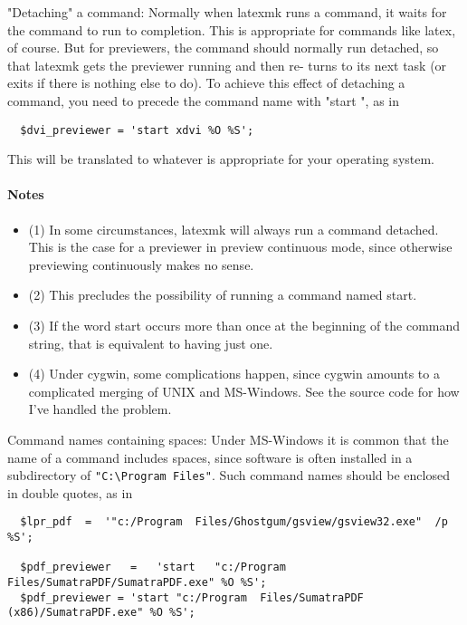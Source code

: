 "Detaching" a command: Normally when latexmk runs a command,  it  waits
for the command to run to completion.  This is appropriate for commands
like latex, of course.  But for previewers, the command should normally
run  detached,  so that latexmk gets the previewer running and then re-
turns to its next task (or exits if there is nothing else to  do).   To
achieve  this  effect  of  detaching a command, you need to precede the
command name with "start ", as in

\begin{verbatim}
  $dvi_previewer = 'start xdvi %O %S';
\end{verbatim}

This will be translated to whatever is appropriate for  your  operating
system.

\paragraph{Notes}

\begin{itemize}
  \item (1) In some circumstances, latexmk will always run a command detached.  This
is the case for a previewer in preview  continuous  mode, since  otherwise
previewing continuously makes no sense.  

  \item (2) This precludes the possibility of running a command named start.   

  \item (3)  If  the word  start  occurs  more  than  once  at  the beginning
          of the command string, that is equivalent to having just one.  

  \item (4) Under cygwin,  some complications  happen, since cygwin amounts to a
        complicated merging of UNIX and MS-Windows.  See the source code  for
        how  I've  handled  the problem.
\end{itemize}

Command names containing spaces: Under MS-Windows it is common that the
name of a command includes spaces, since software is often installed in a
subdirectory of \verb|"C:\Program Files"|.  Such command names should be
enclosed in double quotes, as in

\begin{verbatim}
  $lpr_pdf  =  '"c:/Program  Files/Ghostgum/gsview/gsview32.exe"  /p %S';
  
  $pdf_previewer   =   'start   "c:/Program   Files/SumatraPDF/SumatraPDF.exe" %O %S';
  $pdf_previewer = 'start "c:/Program  Files/SumatraPDF  (x86)/SumatraPDF.exe" %O %S';
\end{verbatim}


